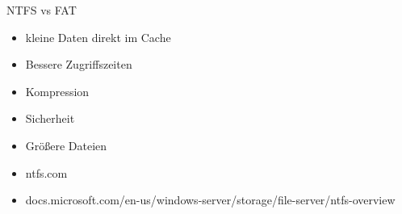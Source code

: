 \documentclass[12pt]{beamer}
\begin{document}
\begin{frame}{NTFS vs FAT}
\begin{itemize}
\item kleine Daten direkt im Cache
\item Bessere Zugriffszeiten
\item Kompression
\item Sicherheit
\item Größere Dateien
\end{itemize}
\end{frame}

\begin{frame}
\small
\begin{itemize}
\small
\item ntfs.com
\item docs.microsoft.com/en-us/windows-server/storage/file-server/ntfs-overview
\end{itemize}
\end{frame}
\end{document}
